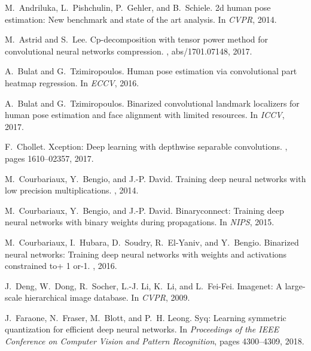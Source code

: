 \documentclass[10pt,twocolumn,letterpaper]{article}
\begin{document}
{\small

\begin{thebibliography}{10}\itemsep=-1pt

M.~Andriluka, L.~Pishchulin, P.~Gehler, and B.~Schiele.
\newblock 2d human pose estimation: New benchmark and state of the art
  analysis.
\newblock In {\em CVPR}, 2014.

M.~Astrid and S.~Lee.
\newblock Cp-decomposition with tensor power method for convolutional neural
  networks compression.
, abs/1701.07148, 2017.

A.~Bulat and G.~Tzimiropoulos.
\newblock Human pose estimation via convolutional part heatmap regression.
\newblock In {\em ECCV}, 2016.

A.~Bulat and G.~Tzimiropoulos.
\newblock Binarized convolutional landmark localizers for human pose estimation
  and face alignment with limited resources.
\newblock In {\em ICCV}, 2017.

F.~Chollet.
\newblock Xception: Deep learning with depthwise separable convolutions.
, pages 1610--02357, 2017.

M.~Courbariaux, Y.~Bengio, and J.-P. David.
\newblock Training deep neural networks with low precision multiplications.
, 2014.

M.~Courbariaux, Y.~Bengio, and J.-P. David.
\newblock Binaryconnect: Training deep neural networks with binary weights
  during propagations.
\newblock In {\em NIPS}, 2015.

M.~Courbariaux, I.~Hubara, D.~Soudry, R.~El-Yaniv, and Y.~Bengio.
\newblock Binarized neural networks: Training deep neural networks with weights
  and activations constrained to+ 1 or-1.
, 2016.

J.~Deng, W.~Dong, R.~Socher, L.-J. Li, K.~Li, and L.~Fei-Fei.
\newblock Imagenet: A large-scale hierarchical image database.
\newblock In {\em CVPR}, 2009.

J.~Faraone, N.~Fraser, M.~Blott, and P.~H. Leong.
\newblock Syq: Learning symmetric quantization for efficient deep neural
  networks.
\newblock In {\em Proceedings of the IEEE Conference on Computer Vision and
  Pattern Recognition}, pages 4300--4309, 2018.


\end{thebibliography}}
\end{document}
